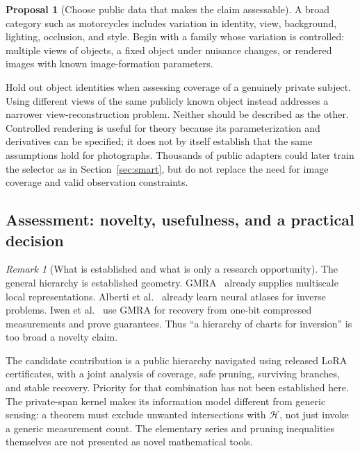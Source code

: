 \documentclass[11pt,a4paper]{article}
\theoremstyle{definition}
\theoremstyle{definition}
\newtheorem{proposal}[theorem]{Proposal}
\theoremstyle{remark}\newtheorem{remark}[theorem]{Remark}
\newcommand{\HH}{\mathcal H}\newcommand{\XX}{\mathcal X}\newcommand{\col}{\operatorname{col}}
\begin{document}
\begin{proposal}[Choose public data that makes the claim assessable]\label{pr:treedata}
A broad category such as motorcycles includes variation in identity, view, background, lighting, occlusion, and style. Begin with a family whose variation is controlled: multiple views of objects, a fixed object under nuisance changes, or rendered images with known image-formation parameters.

Hold out object identities when assessing coverage of a genuinely private subject. Using different views of the same publicly known object instead addresses a narrower view-reconstruction problem. Neither should be described as the other. Controlled rendering is useful for theory because its parameterization and derivatives can be specified; it does not by itself establish that the same assumptions hold for photographs. Thousands of public adapters could later train the selector as in Section~\ref{sec:smart}, but do not replace the need for image coverage and valid observation constraints.
\end{proposal}

\subsection{Assessment: novelty, usefulness, and a practical decision}

\begin{remark}[What is established and what is only a research opportunity]\label{rem:treenovelty}
The general hierarchy is established geometry. GMRA~\cite{gmra} already supplies multiscale local representations. Alberti et al.~\cite{mixturevae} already learn neural atlases for inverse problems. Iwen et al.~\cite{onebitgmra} use GMRA for recovery from one-bit compressed measurements and prove guarantees. Thus ``a hierarchy of charts for inversion'' is too broad a novelty claim.

The candidate contribution is a public hierarchy navigated using released LoRA certificates, with a joint analysis of coverage, safe pruning, surviving branches, and stable recovery. Priority for that combination has not been established here. The private-span kernel makes its information model different from generic sensing: a theorem must exclude unwanted intersections with $\HH$, not just invoke a generic measurement count. The elementary series and pruning inequalities themselves are not presented as novel mathematical tools.
\end{remark}
\end{document}
